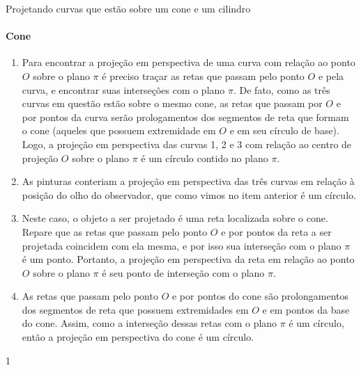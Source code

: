 \begin{answer}{Projetando curvas que estão sobre um cone e um cilindro}
{

\paragraph{Cone}
\begin{enumerate}
\item {} 
Para encontrar a projeção em perspectiva de uma curva com relação ao ponto \(O\) sobre o plano \(\pi\) é preciso traçar as retas que passam pelo ponto \(O\) e pela curva, e encontrar suas interseções com o plano \(\pi\). De fato, como as três curvas em questão estão sobre o mesmo cone, as retas que passam por \(O\) e por pontos da curva serão prologamentos dos segmentos de reta que formam o cone (aqueles que possuem extremidade em \(O\) e em seu círculo de base). Logo, a projeção em perspectiva das curvas 1, 2 e 3 com relação ao centro de projeção \(O\) sobre o plano \(\pi\) é um círculo contido no plano \(\pi\).

\item {} 
As pinturas conteriam a projeção em perspectiva das três curvas em relação à posição do olho do observador, que como vimos no item anterior é um círculo.

\item {} 
Neste caso, o objeto a ser projetado é uma reta localizada sobre o cone. Repare que as retas que passam pelo ponto \(O\) e por pontos da reta a ser projetada coincidem com ela mesma, e por isso sua interseção com o plano \(\pi\) é um ponto. Portanto, a projeção em perspectiva da reta em relação ao ponto \(O\) sobre o plano \(\pi\) é seu ponto de interseção com o plano \(\pi\).

\item {} 
As retas que passam pelo ponto \(O\) e por pontos do cone são prolongamentos dos segmentos de reta que possuem extremidades em \(O\) e em pontos da base do cone. Assim, como a interseção dessas retas com o plano \(\pi\) é um círculo, então a projeção em perspectiva do cone é um círculo.
\end{enumerate}
}{1}
\end{answer}
\clearmargin
